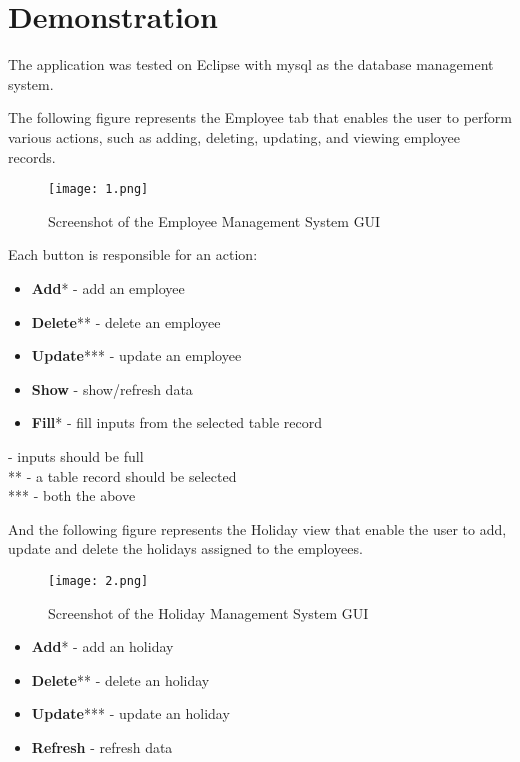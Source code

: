 \documentclass[12pt]{article}
\begin{document}
\pagebreak

\section{Demonstration}

The application was tested on Eclipse with mysql as the
database management system.

\vspace{0.6cm}

The following figure represents the Employee tab that enables
the user to perform various actions, such as adding, deleting,
updating, and viewing employee records.

\begin{figure}[H]
  \centering
  \texttt{[image: 1.png]}
  \caption{Screenshot of the Employee Management System GUI}
\end{figure}

Each button is responsible for an action:

\begin{itemize}
    \item \textbf{Add}* - add an employee
    \item \textbf{Delete}** - delete an employee
    \item \textbf{Update}*** - update an employee
    \item \textbf{Show} - show/refresh data
    \item \textbf{Fill}* - fill inputs from the selected table record
\end{itemize}

\noindent * - inputs should be full\\
** - a table record should be selected\\
*** - both the above

\pagebreak

And the following figure represents the Holiday view that enable
the user to add, update and delete the holidays assigned to the
employees.

\begin{figure}[H]
  \centering
  \texttt{[image: 2.png]}
  \caption{Screenshot of the Holiday Management System GUI}
\end{figure}

\begin{itemize}
    \item \textbf{Add}* - add an holiday
    \item \textbf{Delete}** - delete an holiday
	\item \textbf{Update}*** - update an holiday
    \item \textbf{Refresh} - refresh data
\end{itemize}
\end{document}
